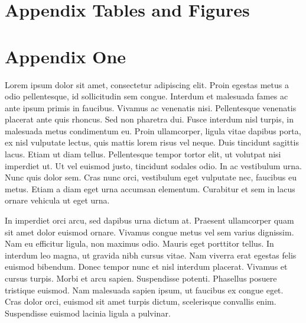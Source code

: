 \documentclass[12pt]{article}
\begin{document}
\clearpage
\begin{singlespace}
%
%


\end{singlespace}


\newpage
\appendix
\setcounter{table}{0}
\renewcommand{\tablename}{Appendix Table}
\renewcommand{\figurename}{Appendix Figure}
\renewcommand{\thetable}{A\arabic{table}}
\setcounter{figure}{0}
\renewcommand{\thefigure}{A\arabic{figure}}

\section{Appendix Tables and Figures}


\newpage 
\section{Appendix One \label{sec:appendix:first}}
\renewcommand{\thetable}{B\arabic{table}}
\setcounter{table}{0}
\renewcommand{\thefigure}{B\arabic{figure}}
\setcounter{figure}{0}

Lorem ipsum dolor sit amet, consectetur adipiscing elit. Proin egestas metus a odio pellentesque, id sollicitudin sem congue. Interdum et malesuada fames ac ante ipsum primis in faucibus. Vivamus ac venenatis nisi. Pellentesque venenatis placerat ante quis rhoncus. Sed non pharetra dui. Fusce interdum nisl turpis, in malesuada metus condimentum eu. Proin ullamcorper, ligula vitae dapibus porta, ex nisl vulputate lectus, quis mattis lorem risus vel neque. Duis tincidunt sagittis lacus. Etiam ut diam tellus. Pellentesque tempor tortor elit, ut volutpat nisi imperdiet ut. Ut vel euismod justo, tincidunt sodales odio. In ac vestibulum urna. Nunc quis dolor sem. Cras nunc orci, vestibulum eget vulputate nec, faucibus eu metus. Etiam a diam eget urna accumsan elementum. Curabitur et sem in lacus ornare vehicula ut eget urna.

In imperdiet orci arcu, sed dapibus urna dictum at. Praesent ullamcorper quam sit amet dolor euismod ornare. Vivamus congue metus vel sem varius dignissim. Nam eu efficitur ligula, non maximus odio. Mauris eget porttitor tellus. In interdum leo magna, ut gravida nibh cursus vitae. Nam viverra erat egestas felis euismod bibendum. Donec tempor nunc et nisl interdum placerat. Vivamus et cursus turpis. Morbi et arcu sapien. Suspendisse potenti. Phasellus posuere tristique euismod. Nam malesuada sapien ipsum, ut faucibus ex congue eget. Cras dolor orci, euismod sit amet turpis dictum, scelerisque convallis enim. Suspendisse euismod lacinia ligula a pulvinar.
\end{document}

